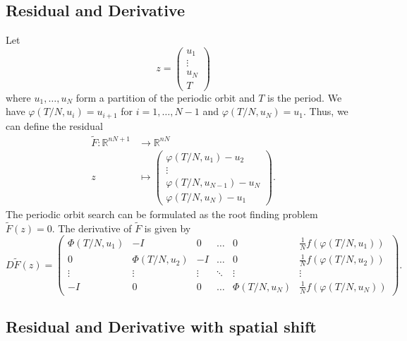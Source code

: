 \documentclass[11pt,a4paper]{article}
\begin{document}
\subsection{Residual and Derivative}
Let \begin{equation*}
    z = \begin{pmatrix} u_1 \\ \vdots \\ u_N \\ T \end{pmatrix}
\end{equation*}
where $u_1, \dots, u_N$ form a partition of the periodic orbit and $T$ is the period. We have $\varphi(T/N,u_i) = u_{i+1}$ for $i=1,\dots,N-1$ and $\varphi(T/N,u_N) = u_1$. Thus, we can define the residual
\begin{align*}
    \tilde{F}: \mathbb{R}^{nN+1} &\to \mathbb{R}^{nN} \\
    z &\mapsto \begin{pmatrix} \varphi(T/N,u_1)-u_2 \\ \vdots \\ \varphi(T/N,u_{N-1})-u_N \\ \varphi(T/N,u_N)-u_1 \end{pmatrix}.
\end{align*}
The periodic orbit search can be formulated as the root finding problem $\tilde{F}(z) = 0$. The derivative of $\tilde{F}$ is given by \begin{equation}
    D\tilde{F}(z) = \begin{pmatrix} \Phi(T/N,u_1) & -I & 0 & \dots & 0 & \frac{1}{N}f(\varphi(T/N,u_1)) \\ 0 & \Phi(T/N,u_2) & -I & \dots & 0 & \frac{1}{N}f(\varphi(T/N,u_2)) \\ \vdots & \vdots & \vdots & \ddots & \vdots & \vdots \\ -I & 0 & 0 & \dots & \Phi(T/N,u_N) & \frac{1}{N}f(\varphi(T/N,u_N))\end{pmatrix}.
\end{equation}

\subsection{Residual and Derivative with spatial shift}
\end{document}
